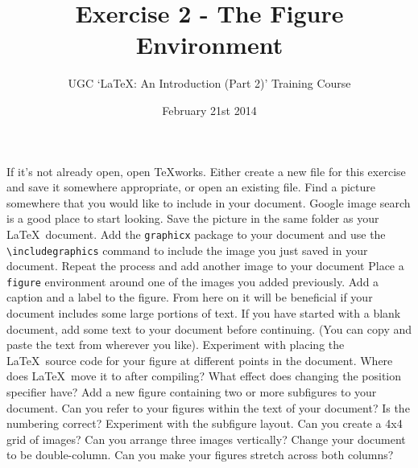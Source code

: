 \documentclass[11pt]{exam}
\title{Exercise 2 - The Figure Environment}
\author{UGC `\LaTeX: An Introduction (Part 2)' Training Course}
\date{February 21st 2014}
\begin{document}
\maketitle


\vspace{0.2in}

\begin{questions}
\question
If it's not already open, open TeXworks. Either create a new file for this exercise and save it somewhere appropriate, or open an existing file.
\question
Find a picture somewhere that you would like to include in your document. Google image search is a good place to start looking.
\question
Save the picture in the same folder as your \LaTeX\ document.
\question
Add the \texttt{graphicx} package to your document and use the \texttt{{\textbackslash}includegraphics} command to include the image you just saved in your document.
\question
Repeat the process and add another image to your document
\question
Place a \texttt{figure} environment around one of the images you added previously.
\question
Add a caption and a label to the figure.
\uplevel
{From here on it will be beneficial if your document includes some large portions of text. If you have started with a blank document, add some text to your document before continuing. (You can copy and paste the text from wherever you like).}
\question
Experiment with placing the \LaTeX\ source code for your figure at different points in the document. Where does \LaTeX\ move it to after compiling? 
\question
What effect does changing the position specifier have?
\question
Add a new figure containing two or more subfigures to your document. 
\question
Can you refer to your figures within the text of your document? Is the numbering correct?
\question
Experiment with the subfigure layout. Can you create a 4x4 grid of images? Can you arrange three images vertically?
\question
Change your document to be double-column. Can you make your figures stretch across both columns?
\end{questions}
\end{document}
